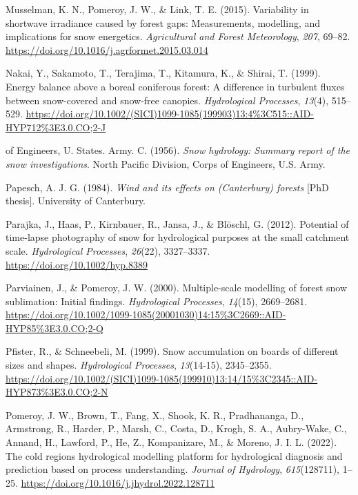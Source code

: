 \documentclass[
  letterpaper,
]{tex/uofsthesis-cs}
\newlength{\cslhangindent}
\newenvironment{CSLReferences}[2] %
 {\begin{list}{}{%
  \setlength{\itemindent}{0pt}
  \setlength{\leftmargin}{0pt}
  \setlength{\parsep}{0pt}
  \ifodd #1
   \setlength{\leftmargin}{\cslhangindent}
   \setlength{\itemindent}{-1\cslhangindent}
  \fi
  \setlength{\itemsep}{#2\baselineskip}}}
 {\end{list}}
\begin{document}
\begin{CSLReferences}{1}{0}
Musselman, K. N., Pomeroy, J. W., \& Link, T. E. (2015). Variability in
shortwave irradiance caused by forest gaps: {Measurements}, modelling,
and implications for snow energetics. \emph{Agricultural and Forest
Meteorology}, \emph{207}, 69--82.
\url{https://doi.org/10.1016/j.agrformet.2015.03.014}

Nakai, Y., Sakamoto, T., Terajima, T., Kitamura, K., \& Shirai, T.
(1999). Energy balance above a boreal coniferous forest: {A} difference
in turbulent fluxes between snow-covered and snow-free canopies.
\emph{Hydrological Processes}, \emph{13}(4), 515--529.
\url{https://doi.org/10.1002/(SICI)1099-1085(199903)13:4\%3C515::AID-HYP712\%3E3.0.CO;2-J}

of Engineers, U. States. Army. C. (1956). \emph{Snow hydrology:
{Summary} report of the snow investigations}. North Pacific Division,
Corps of Engineers, U.S. Army.

Papesch, A. J. G. (1984). \emph{Wind and its effects on ({Canterbury})
forests} {[}PhD thesis{]}. University of Canterbury.

Parajka, J., Haas, P., Kirnbauer, R., Jansa, J., \& Blöschl, G. (2012).
Potential of time-lapse photography of snow for hydrological purposes at
the small catchment scale. \emph{Hydrological Processes}, \emph{26}(22),
3327--3337. \url{https://doi.org/10.1002/hyp.8389}

Parviainen, J., \& Pomeroy, J. W. (2000). Multiple-scale modelling of
forest snow sublimation: {Initial} findings. \emph{Hydrological
Processes}, \emph{14}(15), 2669--2681.
\url{https://doi.org/10.1002/1099-1085(20001030)14:15\%3C2669::AID-HYP85\%3E3.0.CO;2-Q}

Pfister, R., \& Schneebeli, M. (1999). Snow accumulation on boards of
different sizes and shapes. \emph{Hydrological Processes},
\emph{13}(14-15), 2345--2355.
\url{https://doi.org/10.1002/(SICI)1099-1085(199910)13:14/15\%3C2345::AID-HYP873\%3E3.0.CO;2-N}

Pomeroy, J. W., Brown, T., Fang, X., Shook, K. R., Pradhananga, D.,
Armstrong, R., Harder, P., Marsh, C., Costa, D., Krogh, S. A.,
Aubry-Wake, C., Annand, H., Lawford, P., He, Z., Kompanizare, M., \&
Moreno, J. I. L. (2022). The cold regions hydrological modelling
platform for hydrological diagnosis and prediction based on process
understanding. \emph{Journal of Hydrology}, \emph{615}(128711), 1--25.
\url{https://doi.org/10.1016/j.jhydrol.2022.128711}


\end{CSLReferences}
\end{document}

